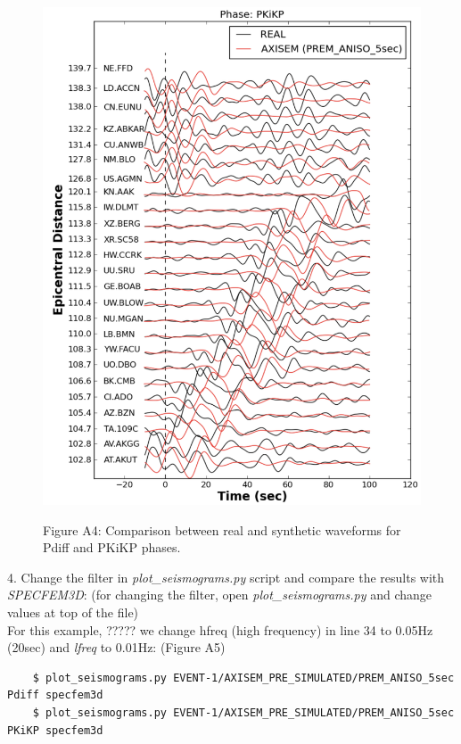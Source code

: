 \documentclass{article}
\begin{document}
\begin{figure}
\begin{minipage}{.5\textwidth}
  \includegraphics[width=1.\linewidth]{AXISEMTutorial-fig009.pdf}
\end{minipage}
\begin{center}
{\small{}Figure A4: Comparison between real and synthetic waveforms for Pdiff and 
PKiKP phases.}
\end{center}
\end{figure}


4. Change the filter in \textit{plot\_seismograms.py} script and compare the results with 
\textit{SPECFEM3D}: (for changing the filter, open \textit{plot\_seismograms.py} and change 
values at top of the file) \\
For this example, ????? we change hfreq (high frequency) in line 34 to 0.05Hz (20sec) and \textit{lfreq }to 0.01Hz: (Figure 
A5)

\begin{verbatim}
    $ plot_seismograms.py EVENT-1/AXISEM_PRE_SIMULATED/PREM_ANISO_5sec Pdiff specfem3d
    $ plot_seismograms.py EVENT-1/AXISEM_PRE_SIMULATED/PREM_ANISO_5sec PKiKP specfem3d
\end{verbatim}
\end{document}
